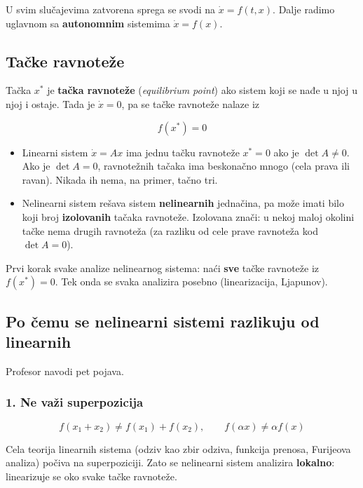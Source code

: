 \documentclass[11pt,a4paper,parskip=half,headsepline,numbers=noenddot]{scrartcl}
\begin{document}
U svim slučajevima zatvorena sprega se svodi na \(\dot x = f(t, x)\). Dalje radimo uglavnom sa \textbf{autonomnim} sistemima \(\dot x = f(x)\).

\subsection{Tačke ravnoteže}

Tačka \(x^*\) je \textbf{tačka ravnoteže} (\emph{equilibrium point}) ako sistem koji se nađe u njoj u njoj i ostaje. Tada je \(\dot x = 0\), pa se tačke ravnoteže nalaze iz

\[f(x^*) = 0\]

\begin{itemize}
\item Linearni sistem \(\dot x = Ax\) ima jednu tačku ravnoteže \(x^* = 0\) ako je \(\det A \ne 0\). Ako je \(\det A = 0\), ravnotežnih tačaka ima beskonačno mnogo (cela prava ili ravan). Nikada ih nema, na primer, tačno tri.
\item Nelinearni sistem rešava sistem \textbf{nelinearnih} jednačina, pa može imati bilo koji broj \textbf{izolovanih} tačaka ravnoteže. Izolovana znači: u nekoj maloj okolini tačke nema drugih ravnoteža (za razliku od cele prave ravnoteža kod \(\det A = 0\)).
\end{itemize}

\begin{kljucna}
Prvi korak svake analize nelinearnog sistema: naći \textbf{sve} tačke ravnoteže iz \(f(x^*) = 0\). Tek onda se svaka analizira posebno (linearizacija, Ljapunov).
\end{kljucna}

\subsection{Po čemu se nelinearni sistemi razlikuju od linearnih}

Profesor navodi pet pojava.

\subsubsection{1. Ne važi superpozicija}

\[f(x_1 + x_2) \ne f(x_1) + f(x_2), \qquad f(\alpha x) \ne \alpha f(x)\]

Cela teorija linearnih sistema (odziv kao zbir odziva, funkcija prenosa, Furijeova analiza) počiva na superpoziciji. Zato se nelinearni sistem analizira \textbf{lokalno}: linearizuje se oko svake tačke ravnoteže.
\end{document}
